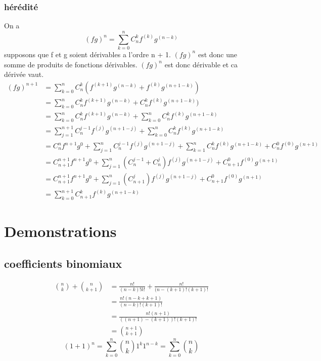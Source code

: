 \documentclass[a4paper,10pt]{article}
\begin{document}
\subsubsection{hérédité}
On a \[(fg)^{n} = \sum_{k = 0}^{n}C^{k}_{n}f^{(k)}g^{(n-k)}\] supposons que f et g soient dérivables a l'ordre n + 1.
$(fg)^{n}$ est donc une somme de produits de fonctions dérivables. $(fg)^{n}$ est donc dérivable et ca dérivée vaut.
\begin{align*}
(fg)^{n + 1} &= \sum_{k = 0}^{n}C^{k}_{n}(f^{(k + 1)}g^{(n-k)} + f^{(k)}g^{(n + 1 -k)})\\
&= \sum_{k = 0}^{n}C^{k}_{n}f^{(k + 1)}g^{(n-k)} + C^{k}_{n}f^{(k)}g^{(n + 1 -k)})\\
&= \sum_{k = 0}^{n}C^{k}_{n}f^{(k + 1)}g^{(n-k)} + \sum_{k = 0}^{n}C^{k}_{n}f^{(k)}g^{(n + 1 -k)}\\
&= \sum_{j = 1}^{n + 1}C^{j - 1}_{n}f^{(j)}g^{(n + 1 -j)} + \sum_{k = 0}^{n}C^{k}_{n}f^{(k)}g^{(n + 1 -k)}\\
&=C^{n}_{n}f^{n + 1}g^{0} +  \sum_{j = 1}^{n}C^{j - 1}_{n}f^{(j)}g^{(n + 1 -j)} + \sum_{k = 1}^{n}C^{k}_{n}f^{(k)}g^{(n + 1 -k)} + C^{0}_{n}f^{(0)}g^{(n + 1)}\\
&=C^{n + 1}_{n + 1}f^{n + 1}g^{0} +  \sum_{j = 1}^{n}(C^{j - 1}_{n} + C^{j}_{n})f^{(j)}g^{(n + 1 -j)} + C^{0}_{n + 1}f^{(0)}g^{(n + 1)}\\
&=C^{n + 1}_{n + 1}f^{n + 1}g^{0} +  \sum_{j = 1}^{n}(C^{j}_{n + 1})f^{(j)}g^{(n + 1 -j)} + C^{0}_{n + 1}f^{(0)}g^{(n + 1)}\\
&= \sum_{k = 0}^{n + 1}C^{k}_{n + 1}f^{(k)}g^{(n + 1-k)}
\end{align*}
\appendix
\section{Demonstrations}
\subsection{coefficients binomiaux}
\begin{align*}
 \textstyle{n \choose k} + \textstyle{n \choose k + 1} &= \frac{n!}{(n - k)!k!} + \frac{n!}{(n - (k + 1)!(k + 1)!}\\
 &= \frac{n!(n - k + k + 1)}{(n - k)!(k + 1)!}\\
 &= \frac{n!(n + 1)}{((n + 1) - (k + 1))!(k + 1)!}\\
 &= \textstyle{n + 1 \choose k + 1}
\end{align*}
\[(1 + 1)^{n} = \sum_{k = 0}^{n} \textstyle{n \choose k} 1^{k}1^{n - k} = \sum_{k = 0}^{n} \textstyle{n \choose k}\]
\end{document}
